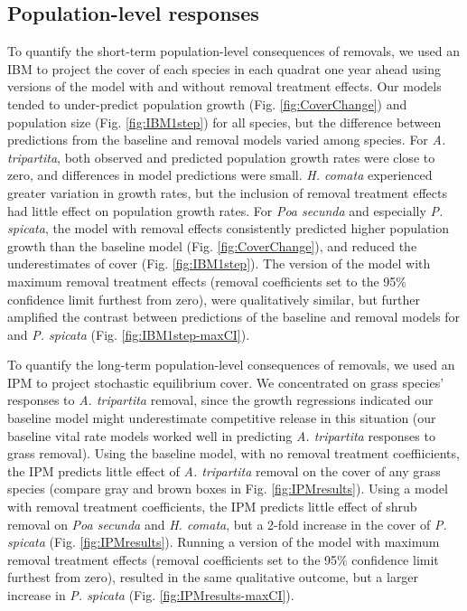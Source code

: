 \documentclass[11pt]{article}
\begin{document}
\begin{doublespacing}
\subsection*{Population-level responses}

To quantify the short-term population-level consequences of removals, we used an IBM to project the cover of each species in each quadrat one year ahead using versions of the model with and without removal treatment effects. Our models tended to under-predict population growth (Fig. \ref{fig:CoverChange}) and population size (Fig. \ref{fig:IBM1step}) for all species, but the difference between predictions from the baseline and removal models varied among species. For \textit{A. tripartita}, both observed and predicted population growth rates were close to zero, and differences in model predictions were small. \textit{H. comata} experienced greater variation in growth rates, but the inclusion of removal treatment effects had little effect on population growth rates. For \textit{Poa secunda} and especially \textit{P. spicata}, the model with removal effects consistently predicted higher population growth than the baseline model (Fig. \ref{fig:CoverChange}), and reduced the underestimates of cover (Fig. \ref{fig:IBM1step}). The version of the model with maximum removal treatment effects (removal coefficients set to the 95\% confidence limit furthest from zero), were qualitatively similar, but further amplified the contrast between predictions of the baseline and removal models for and \textit{P. spicata} (Fig. \ref{fig:IBM1step-maxCI}).

To quantify the long-term population-level consequences of removals, we used an IPM to project stochastic equilibrium cover. We concentrated on grass species' responses to \textit{A. tripartita} removal, since the growth regressions indicated our baseline model might underestimate competitive release in this situation (our baseline vital rate models worked well in predicting \textit{A. tripartita} responses to grass removal). Using the baseline model, with no removal treatment coeffiicients, the IPM predicts little effect of \textit{A. tripartita} removal on the cover of any grass species (compare gray and brown boxes in Fig. \ref{fig:IPMresults}). Using a model with removal treatment coefficients, the IPM predicts little effect of shrub removal on \textit{Poa secunda} and \textit{H. comata}, but a 2-fold increase in the cover of \textit{P. spicata} (Fig. \ref{fig:IPMresults}). Running a version of the model with maximum removal treatment effects (removal coefficients set to the 95\% confidence limit furthest from zero), resulted in the same qualitative outcome, but a larger increase in \textit{P. spicata} (Fig. \ref{fig:IPMresults-maxCI}). 


\end{doublespacing}
\end{document}

